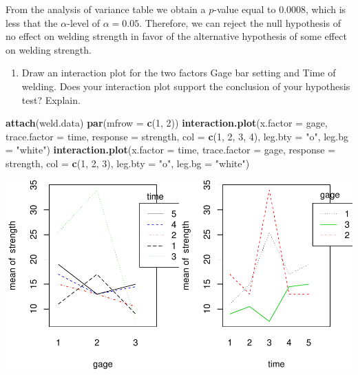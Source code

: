 \documentclass[12pt,]{article}
\newenvironment{Shaded}{\begin{snugshade}}{\end{snugshade}}
\newcommand{\KeywordTok}[1]{\textcolor[rgb]{0.13,0.29,0.53}{\textbf{#1}}}
\newcommand{\DataTypeTok}[1]{\textcolor[rgb]{0.13,0.29,0.53}{#1}}
\newcommand{\DecValTok}[1]{\textcolor[rgb]{0.00,0.00,0.81}{#1}}
\newcommand{\StringTok}[1]{\textcolor[rgb]{0.31,0.60,0.02}{#1}}
\newcommand{\NormalTok}[1]{#1}
\providecommand{\tightlist}{%
  \setlength{\itemsep}{0pt}\setlength{\parskip}{0pt}}
\begin{document}
From the analysis of variance table we obtain a \(p\)-value equal to
\(0.0008\), which is less that the \(\alpha\)-level of
\(\alpha = 0.05\). Therefore, we can reject the null hypothesis of no
effect on welding strength in favor of the alternative hypothesis of
some effect on welding strength.

\begin{enumerate}
\def\labelenumi{(\alph{enumi})}
\setcounter{enumi}{1}
\tightlist
\item
  Draw an interaction plot for the two factors Gage bar setting and Time
  of welding. Does your interaction plot support the conclusion of your
  hypothesis test? Explain.
\end{enumerate}

\begin{Shaded}
\begin{Highlighting}[]
\KeywordTok{attach}\NormalTok{(weld.data)}
\KeywordTok{par}\NormalTok{(}\DataTypeTok{mfrow =} \KeywordTok{c}\NormalTok{(}\DecValTok{1}\NormalTok{, }\DecValTok{2}\NormalTok{))}
\KeywordTok{interaction.plot}\NormalTok{(}\DataTypeTok{x.factor =}\NormalTok{ gage, }\DataTypeTok{trace.factor =}\NormalTok{ time, }\DataTypeTok{response =}\NormalTok{ strength,}
\DataTypeTok{col =} \KeywordTok{c}\NormalTok{(}\DecValTok{1}\NormalTok{, }\DecValTok{2}\NormalTok{, }\DecValTok{3}\NormalTok{, }\DecValTok{4}\NormalTok{), }\DataTypeTok{leg.bty =} \StringTok{"o"}\NormalTok{, }\DataTypeTok{leg.bg =} \StringTok{"white"}\NormalTok{) }
\KeywordTok{interaction.plot}\NormalTok{(}\DataTypeTok{x.factor =}\NormalTok{ time, }\DataTypeTok{trace.factor =}\NormalTok{ gage, }\DataTypeTok{response =}\NormalTok{ strength,}
\DataTypeTok{col =} \KeywordTok{c}\NormalTok{(}\DecValTok{1}\NormalTok{, }\DecValTok{2}\NormalTok{, }\DecValTok{3}\NormalTok{), }\DataTypeTok{leg.bty =} \StringTok{"o"}\NormalTok{, }\DataTypeTok{leg.bg =} \StringTok{"white"}\NormalTok{)}
\end{Highlighting}
\end{Shaded}

\includegraphics{Markdown_HW_6_files/figure-latex/unnamed-chunk-7-1.pdf}
\end{document}
